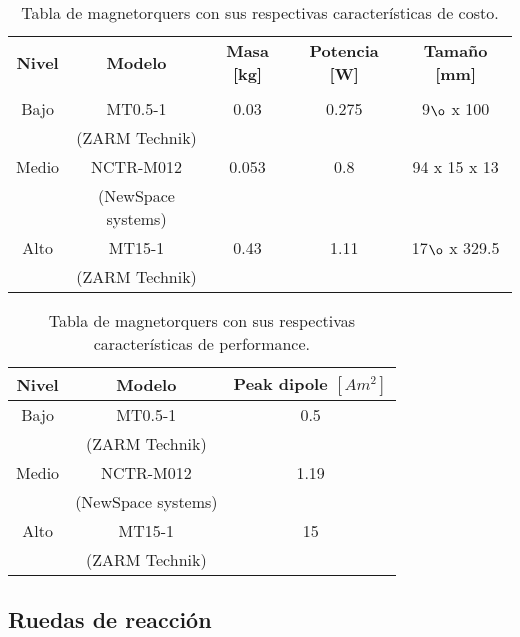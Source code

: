 \begin{table}[H]
	\centering
	\caption{Tabla de magnetorquers con sus respectivas características de costo.}
	\begin{tabular}{|c|c|c|c|c|}
		\hline
		\textbf{Nivel} & \textbf{Modelo} & \textbf{Masa [kg]} & \textbf{Potencia [W]} & \textbf{Tamaño [mm]}  \\
		& &  &  &   \\ \hline
		Bajo & MT0.5-1 \cite{ref56} & 0.03
		& 0.275 & 9$\o$ x 100 \\
		& (ZARM Technik) &  &  &  \\ \hline
		Medio & NCTR-M012 \cite{ref57} & 0.053 & 0.8 &  94 x 15 x 13  \\
		& (NewSpace systems) & &  &  \\ \hline
		Alto & MT15-1 \cite{ref58} & 0.43 & 1.11
		& 17$\o$ x 329.5  \\
		& (ZARM Technik) & &  &   \\ \hline
	\end{tabular}
	
\end{table}

\begin{table}[H]
	\centering
	\caption{Tabla de magnetorquers con sus respectivas características de performance.}
	\begin{tabular}{|c|c|c|}
		\hline
		\textbf{Nivel} & \textbf{Modelo} & \textbf{Peak dipole $[Am^2]$}  \\ \hline
		Bajo & MT0.5-1 & 0.5  \\
		& (ZARM Technik) &   \\ \hline
		Medio & NCTR-M012 & 1.19  \\
		& (NewSpace systems) &   \\ \hline
		Alto & MT15-1 & 15   \\
		& (ZARM Technik) &    \\ \hline
	\end{tabular}
	
\end{table}

\subsection{Ruedas de reacción}


